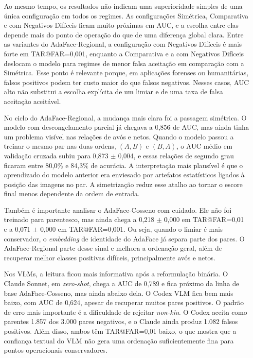 Ao mesmo tempo, os resultados não indicam uma superioridade simples de uma única configuração em todos os regimes. As configurações Simétrica, Comparativa e com Negativos Difíceis ficam muito próximas em AUC, e a escolha entre elas depende mais do ponto de operação do que de uma diferença global clara. Entre as variantes do AdaFace-Regional, a configuração com Negativos Difíceis é mais forte em TAR@FAR=0{,}001, enquanto a Comparativa e a com Negativos Difíceis deslocam o modelo para regimes de menor falsa aceitação em comparação com a Simétrica. Esse ponto é relevante porque, em aplicações forenses ou humanitárias, falsos positivos podem ter custo maior do que falsos negativos. Nesses casos, AUC alto não substitui a escolha explícita de um limiar e de uma taxa de falsa aceitação aceitável.

No ciclo do AdaFace-Regional, a mudança mais clara foi a passagem simétrica. O modelo com descongelamento parcial já chegava a 0,856 de AUC, mas ainda tinha um problema visível nas relações de avós e netos. Quando o modelo passou a treinar o mesmo par nas duas ordens, $(A,B)$ e $(B,A)$, o AUC médio em validação cruzada subiu para 0,873 $\pm$ 0,004, e essas relações de segundo grau ficaram entre 80,0\% e 84,3\% de acurácia. A interpretação mais plausível é que o aprendizado do modelo anterior era enviesado por artefatos estatísticos ligados à posição das imagens no par. A simetrização reduz esse atalho ao tornar o escore final menos dependente da ordem de entrada.

Também é importante analisar o AdaFace-Cosseno com cuidado. Ele não foi treinado para parentesco, mas ainda chega a 0,218 $\pm$ 0,000 em TAR@FAR=0{,}01 e a 0,071 $\pm$ 0,000 em TAR@FAR=0{,}001. Ou seja, quando o limiar é mais conservador, o \textit{embedding} de identidade do AdaFace já separa parte dos pares. O AdaFace-Regional parte desse sinal e melhora a ordenação geral, além de recuperar melhor classes positivas difíceis, principalmente avós e netos.

Nos VLMs, a leitura ficou mais informativa após a reformulação binária. O Claude Sonnet, em \textit{zero-shot}, chega a AUC de 0,789 e fica próximo da linha de base AdaFace-Cosseno, mas ainda abaixo dela. O Codex VLM fica bem mais baixo, com AUC de 0,624, apesar de recuperar muitos pares positivos. O padrão de erro mais importante é a dificuldade de rejeitar \textit{non-kin}. O Codex aceita como parentes 1.857 dos 3.000 pares negativos, e o Claude ainda produz 1.082 falsos positivos. Além disso, ambos têm TAR@FAR=0{,}01 baixo, o que mostra que a confiança textual do VLM não gera uma ordenação suficientemente fina para pontos operacionais conservadores.

